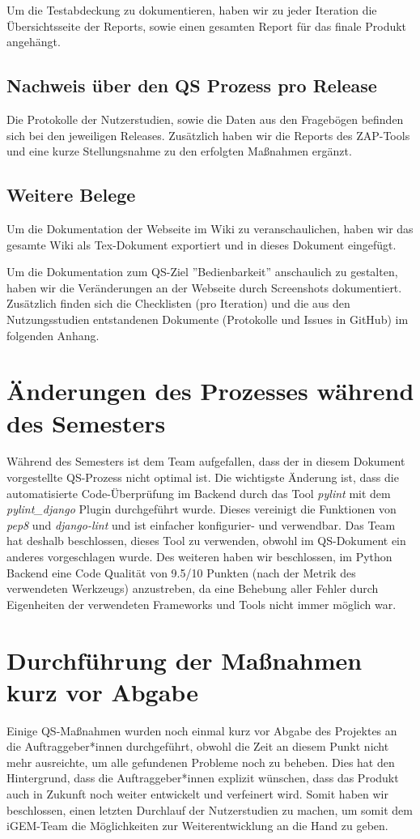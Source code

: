 \documentclass[accentcolor=tud0b,12pt,paper=a4]{tudreport}
\begin{document}
Um die Testabdeckung zu dokumentieren, haben wir zu jeder Iteration die Übersichtsseite der Reports, sowie einen gesamten Report für das finale Produkt angehängt.

\subsection{Nachweis über den QS Prozess pro Release}
Die Protokolle der Nutzerstudien, sowie die Daten aus den Fragebögen befinden sich bei den jeweiligen Releases. Zusätzlich haben wir die Reports des ZAP-Tools und eine kurze Stellungsnahme zu den erfolgten Maßnahmen ergänzt.

\subsection{Weitere Belege}
Um die Dokumentation der Webseite im Wiki zu veranschaulichen, haben wir das gesamte Wiki als Tex-Dokument exportiert und in dieses Dokument eingefügt.

Um die Dokumentation zum QS-Ziel ''Bedienbarkeit'' anschaulich zu gestalten, haben wir die Veränderungen an der Webseite durch Screenshots dokumentiert. Zusätzlich finden sich die Checklisten (pro Iteration) und die aus den Nutzungsstudien entstandenen Dokumente (Protokolle und Issues in GitHub) im folgenden Anhang.

\section{Änderungen des Prozesses während des Semesters}
Während des Semesters ist dem Team aufgefallen, dass der in diesem Dokument vorgestellte QS-Prozess nicht optimal ist. Die wichtigste Änderung ist, dass die automatisierte Code-Überprüfung im Backend durch das Tool \emph{pylint} mit dem \emph{pylint\_django} Plugin durchgeführt wurde. Dieses vereinigt die Funktionen von \emph{pep8} und \emph{django-lint} und ist einfacher konfigurier- und verwendbar. Das Team hat deshalb beschlossen, dieses Tool zu verwenden, obwohl im QS-Dokument ein anderes vorgeschlagen wurde. Des weiteren haben wir beschlossen, im Python Backend eine Code Qualität von 9.5/10 Punkten (nach der Metrik des verwendeten Werkzeugs) anzustreben, da eine Behebung aller Fehler durch Eigenheiten der verwendeten Frameworks und Tools nicht immer möglich war.

\section{Durchführung der Maßnahmen kurz vor Abgabe}
Einige QS-Maßnahmen wurden noch einmal kurz vor Abgabe des Projektes an die Auftraggeber*innen durchgeführt, obwohl die Zeit an diesem Punkt nicht mehr ausreichte, um alle gefundenen Probleme noch zu beheben. Dies hat den Hintergrund, dass die Auftraggeber*innen explizit wünschen, dass das Produkt auch in Zukunft noch weiter entwickelt und verfeinert wird. Somit haben wir beschlossen, einen letzten Durchlauf der Nutzerstudien zu machen, um somit dem iGEM-Team die Möglichkeiten zur Weiterentwicklung an die Hand zu geben.
\end{document}
